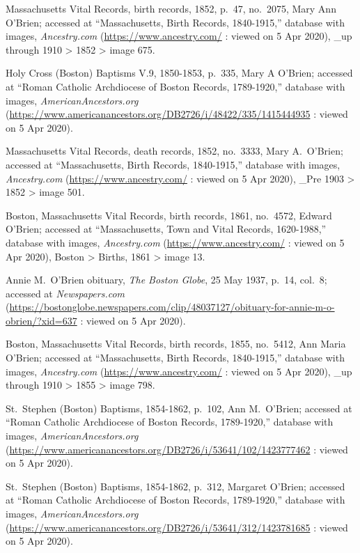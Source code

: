 \begin{thebibliography}{99}
	Massachusetts Vital Records, birth records, 1852, p.\ 47, no.\ 2075, Mary Ann O'Brien; accessed at ``Massachusetts, Birth Records, 1840-1915,'' database with images, \textit{Ancestry.com} (\url{https://www.ancestry.com/} : viewed on 5 Apr 2020), \_up through 1910 > 1852 > image 675.
	
	Holy Cross (Boston) Baptisms V.9, 1850-1853, p.\ 335, Mary A O'Brien; accessed at ``Roman Catholic Archdiocese of Boston Records, 1789-1920,'' database with images, \textit{AmericanAncestors.org} (\url{https://www.americanancestors.org/DB2726/i/48422/335/1415444935} : viewed on 5 Apr 2020).
	
	Massachusetts Vital Records, death records, 1852, no.\ 3333, Mary A.\ O'Brien; accessed at ``Massachusetts, Birth Records, 1840-1915,'' database with images, \textit{Ancestry.com} (\url{https://www.ancestry.com/} : viewed on 5 Apr 2020), \_Pre 1903 > 1852 > image 501.
	
	Boston, Massachusetts Vital Records, birth records, 1861, no.\ 4572, Edward O'Brien; accessed at ``Massachusetts, Town and Vital Records, 1620-1988,'' database with images, \textit{Ancestry.com} (\url{https://www.ancestry.com/} : viewed on 5 Apr 2020), Boston > Births, 1861 > image 13.

	Annie M.\ O'Brien obituary, \textit{The Boston Globe}, 25 May 1937, p.\ 14, col.\ 8; accessed at \textit{Newspapers.com} (\url{https://bostonglobe.newspapers.com/clip/48037127/obituary-for-annie-m-o-obrien/?xid=637} : viewed on 5 Apr 2020).
	
	Boston, Massachusetts Vital Records, birth records, 1855, no.\ 5412, Ann Maria O'Brien; accessed at ``Massachusetts, Birth Records, 1840-1915,'' database with images, \textit{Ancestry.com} (\url{https://www.ancestry.com/} : viewed on 5 Apr 2020), \_up through 1910 > 1855 > image 798.
	
	St.\ Stephen (Boston) Baptisms, 1854-1862, p.\ 102, Ann M.\ O'Brien; accessed at ``Roman Catholic Archdiocese of Boston Records, 1789-1920,'' database with images, \textit{AmericanAncestors.org} (\url{https://www.americanancestors.org/DB2726/i/53641/102/1423777462} : viewed on 5 Apr 2020).
	
	St.\ Stephen (Boston) Baptisms, 1854-1862, p.\ 312, Margaret O'Brien; accessed at ``Roman Catholic Archdiocese of Boston Records, 1789-1920,'' database with images, \textit{AmericanAncestors.org} (\url{https://www.americanancestors.org/DB2726/i/53641/312/1423781685} : viewed on 5 Apr 2020).	
	

\end{thebibliography}
